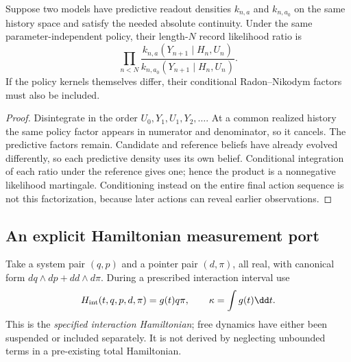 \begin{proposition}\label{prop:likelihood}
Suppose two models have predictive readout densities $k_{n,a}$ and $k_{n,a_0}$ on the same history space and satisfy the needed absolute continuity. Under the same parameter-independent policy, their length-$N$ record likelihood ratio is
\[
 \prod_{n<N}\frac{k_{n,a}(Y_{n+1}\mid H_n,U_n)}
 {k_{n,a_0}(Y_{n+1}\mid H_n,U_n)}.
\]
If the policy kernels themselves differ, their conditional Radon--Nikodym factors must also be included.
\end{proposition}
\begin{proof}
Disintegrate in the order $U_0,Y_1,U_1,Y_2,\ldots$. At a common realized history the same policy factor appears in numerator and denominator, so it cancels. The predictive factors remain. Candidate and reference beliefs have already evolved differently, so each predictive density uses its own belief. Conditional integration of each ratio under the reference gives one; hence the product is a nonnegative likelihood martingale. Conditioning instead on the entire final action sequence is not this factorization, because later actions can reveal earlier observations.
\end{proof}

\subsection{An explicit Hamiltonian measurement port}
Take a system pair $(q,p)$ and a pointer pair $(d,\pi)$, all real, with canonical form $dq\wedge dp+dd\wedge d\pi$. During a prescribed interaction interval use
\[
 H_{\rm int}(t,q,p,d,\pi)=g(t)q\pi,
 \qquad \kappa=\int g(t)\dd t.
\]
This is the \emph{specified interaction Hamiltonian}; free dynamics have either been suspended or included separately. It is not derived by neglecting unbounded terms in a pre-existing total Hamiltonian.


